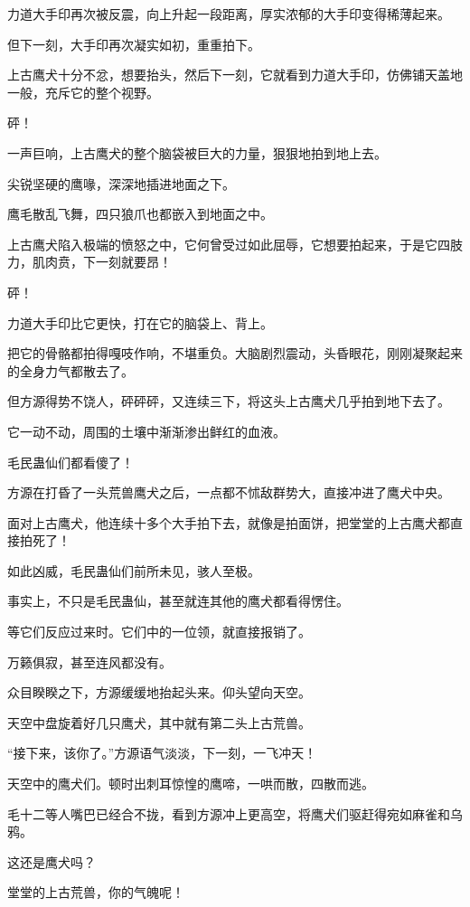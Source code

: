 \begin{this_body}
力道大手印再次被反震，向上升起一段距离，厚实浓郁的大手印变得稀薄起来。

但下一刻，大手印再次凝实如初，重重拍下。

上古鹰犬十分不忿，想要抬头，然后下一刻，它就看到力道大手印，仿佛铺天盖地一般，充斥它的整个视野。

砰！

一声巨响，上古鹰犬的整个脑袋被巨大的力量，狠狠地拍到地上去。

尖锐坚硬的鹰喙，深深地插进地面之下。

鹰毛散乱飞舞，四只狼爪也都嵌入到地面之中。

上古鹰犬陷入极端的愤怒之中，它何曾受过如此屈辱，它想要拍起来，于是它四肢力，肌肉贲，下一刻就要昂！

砰！

力道大手印比它更快，打在它的脑袋上、背上。

把它的骨骼都拍得嘎吱作响，不堪重负。大脑剧烈震动，头昏眼花，刚刚凝聚起来的全身力气都散去了。

但方源得势不饶人，砰砰砰，又连续三下，将这头上古鹰犬几乎拍到地下去了。

它一动不动，周围的土壤中渐渐渗出鲜红的血液。

毛民蛊仙们都看傻了！

方源在打昏了一头荒兽鹰犬之后，一点都不怵敌群势大，直接冲进了鹰犬中央。

面对上古鹰犬，他连续十多个大手拍下去，就像是拍面饼，把堂堂的上古鹰犬都直接拍死了！

如此凶威，毛民蛊仙们前所未见，骇人至极。

事实上，不只是毛民蛊仙，甚至就连其他的鹰犬都看得愣住。

等它们反应过来时。它们中的一位领，就直接报销了。

万籁俱寂，甚至连风都没有。

众目睽睽之下，方源缓缓地抬起头来。仰头望向天空。

天空中盘旋着好几只鹰犬，其中就有第二头上古荒兽。

“接下来，该你了。”方源语气淡淡，下一刻，一飞冲天！

天空中的鹰犬们。顿时出刺耳惊惶的鹰啼，一哄而散，四散而逃。

毛十二等人嘴巴已经合不拢，看到方源冲上更高空，将鹰犬们驱赶得宛如麻雀和乌鸦。

这还是鹰犬吗？

堂堂的上古荒兽，你的气魄呢！


\end{this_body}
